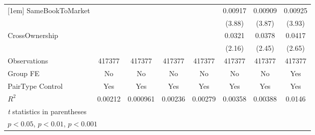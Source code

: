 {\begin{tabular}{l*{7}{c}}
[1em]
SameBookToMarket&                  &                  &                  &                  &  0.00917\sym{***}&  0.00909\sym{***}&  0.00925\sym{***}\\
                &                  &                  &                  &                  &   (3.88)         &   (3.87)         &   (3.93)         \\
[1em]
CrossOwnership  &                  &                  &                  &                  &   0.0321\sym{*}  &   0.0378\sym{*}  &   0.0417\sym{**} \\
                &                  &                  &                  &                  &   (2.16)         &   (2.45)         &   (2.65)         \\
\hline
Observations    &   417377         &   417377         &   417377         &   417377         &   417377         &   417377         &   417377         \\
Group FE        &       No         &       No         &       No         &       No         &       No         &       No         &      Yes         \\
PairType Control&      Yes         &      Yes         &      Yes         &      Yes         &      Yes         &      Yes         &      Yes         \\
$ R^2 $         &  0.00212         & 0.000961         &  0.00236         &  0.00279         &  0.00358         &  0.00388         &   0.0146         \\
\hline\hline
\multicolumn{8}{l}{\footnotesize \textit{t} statistics in parentheses}\\
\multicolumn{8}{l}{\footnotesize \sym{*} \(p<0.05\), \sym{**} \(p<0.01\), \sym{***} \(p<0.001\)}\\
\end{tabular}
}
